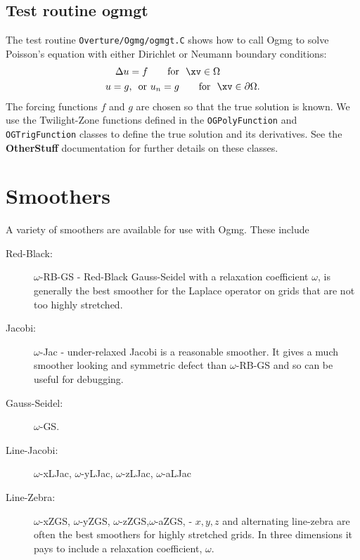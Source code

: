 \documentclass{article}
\begin{document}
\subsection{Test routine ogmgt}

The test routine {\tt Overture/Ogmg/ogmgt.C} shows how to call Ogmg to solve Poisson's
equation with either Dirichlet or Neumann boundary conditions:
\begin{align*}
   \Delta u & = f  \qquad\mbox{for~~} \xv \in \Omega\\
   u=g & \mbox{,~~or~} u_n=g  \qquad\mbox{for~~} \xv \in \partial\Omega.
\end{align*}
The forcing functions $f$ and $g$ are chosen so that the true solution is known.
We use the Twilight-Zone functions defined in the {\tt OGPolyFunction} and {\tt OGTrigFunction}
classes to define the true solution and its derivatives. See the {\bf OtherStuff} documentation \cite{OTHERSTUFF}
for further details on these classes.


\clearpage
\section{Smoothers}

  A variety of smoothers are available for use with Ogmg. These include
\begin{description}
  \item[Red-Black:] $\omega$-RB-GS - Red-Black Gauss-Seidel with a relaxation coefficient $\omega$,
     is generally the
     best smoother for the Laplace operator on grids that are not too highly stretched.
  \item[Jacobi:] $\omega$-Jac - under-relaxed Jacobi is a reasonable smoother. It gives a much smoother
     looking and symmetric defect than $\omega$-RB-GS and so can be useful for debugging.
  \item[Gauss-Seidel:] $\omega$-GS. 
  \item[Line-Jacobi:] $\omega$-xLJac, $\omega$-yLJac, $\omega$-zLJac, $\omega$-aLJac
  \item[Line-Zebra:] $\omega$-xZGS, $\omega$-yZGS, $\omega$-zZGS,$ \omega$-aZGS, - 
    $x,y,z$ and alternating line-zebra are often the best smoothers 
    for highly stretched grids. In three dimensions it pays to include a relaxation coefficient, $\omega$.
\end{description}
\end{document}

